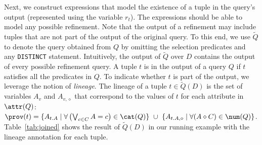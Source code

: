 
Next, we construct expressions that model the existence of a tuple in the query's output (represented using the variable $r_t$). The expressions should be able to model any possible refinement. Note that the output of a refinement may include tuples that are not part of the output of the original query. To this end, we use $\widetilde{Q}$ to denote the query obtained from $Q$ by omitting the selection predicates and any {\tt DISTINCT} statement. Intuitively, the output of $\widetilde{Q}$ over $D$ contains the output of every possible refinement query. A tuple $t$ is in the output of a query $Q$ if $t$ satisfies all the predicates in $Q$. 
To indicate whether $t$ is part of the output, we leverage the notion of {\it lineage}. The lineage of a tuple $t\in\widetilde{Q}(D)$ is the set of variables $A_v$ and $A_{v, \diamond}$ that correspond to the values of $t$ for each attribute in $\attr(Q)$: $\prov(t)=\{A_{t.A} \mid \forall \left( \bigvee_{c \in C} A = c \right) \in \cat(Q)\}~ \cup~ \{A_{t.A, \diamond} \mid \forall (A \diamond C) \in \num(Q)\}$. Table~\ref{tab:joined} shows the result of $\widetilde{Q}(D)$ in our running example with the lineage annotation for each tuple.


